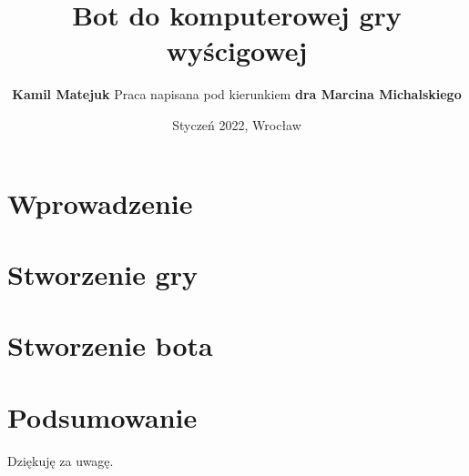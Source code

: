 \documentclass{beamer}
\title{Bot do komputerowej gry wyścigowej}
\author{
	\textbf{Kamil Matejuk}
	\newline \newline
	Praca napisana pod kierunkiem \newline \textbf{dra Marcina Michalskiego}
}
\date{Styczeń 2022, Wrocław}
\begin{document}
\begin{frame}[plain]{}
	\titlepage
\end{frame}


\section{Wprowadzenie}



\section{Stworzenie gry}






\section{Stworzenie bota}







\section{Podsumowanie}



\begin{frame}{}
	\begin{center}
		\large{Dziękuję za uwagę.}
	\end{center}
\end{frame}
\end{document}
